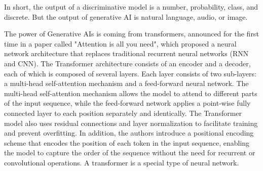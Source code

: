 \documentclass[12pt]{report}
\begin{document}
In short, the output of a discriminative model is a number, probability, class, and discrete. But the output of generative AI is natural language, audio, or image.


The power of Generative AIs is coming from transformers, announced for the first time in a paper called "Attention is all you need", which proposed a neural network architecture that replaces traditional recurrent neural networks (RNN and CNN).
The Transformer architecture consists of an encoder and a decoder, each of which is composed of several layers. Each layer consists of two sub-layers: a multi-head self-attention mechanism and a feed-forward neural network. The multi-head self-attention mechanism allows the model to attend to different parts of the input sequence, while the feed-forward network applies a point-wise fully connected layer to each position separately and identically. The Transformer model also uses residual connections and layer normalization to facilitate training and prevent overfitting. In addition, the authors introduce a positional encoding scheme that encodes the position of each token in the input sequence, enabling the model to capture the order of the sequence without the need for recurrent or convolutional operations. A transformer is a special type of neural network.
\end{document}
